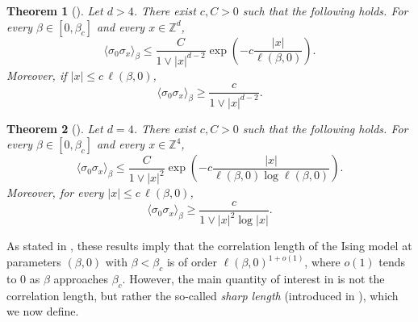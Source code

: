 \documentclass[10pt,a4paper]{amsart}
\numberwithin{equation}{section}
\newtheorem{Thm}{Theorem}[section]
\begin{document}
\begin{Thm}[]\label{thm:bounds 2pt d>4} Let $d>4$. There exist $c,C>0$ such that the following holds. For every $\beta\in [0,\beta_c]$ and every $x\in \mathbb Z^d$,
\begin{equation}
	\langle \sigma_0\sigma_x\rangle_{\beta}\leq \frac{C}{1\vee |x|^{d-2}}\exp\left(-c\frac{|x|}{\ell(\beta,0)}\right).
\end{equation}
Moreover, if $|x|\leq c\,\ell(\beta,0)$,
\begin{equation}
	\langle \sigma_0\sigma_x\rangle_{\beta}\geq \frac{c}{1\vee |x|^{d-2}}.
\end{equation}
\end{Thm}

\begin{Thm}[]\label{thm:bounds 2pt d=4} Let $d=4$. There exist $c,C>0$ such that the following holds. For every $\beta\in [0,\beta_c]$ and every $x\in \mathbb Z^4$,
\begin{equation}\label{eq:nc upper bound d=4 h=0}
	\langle \sigma_0\sigma_x\rangle_{\beta}\leq \frac{C}{1\vee |x|^{2}}\exp\left(-c\frac{|x|}{\ell(\beta,0)\log \ell(\beta,0)}\right).
\end{equation}
Moreover, for every $|x|\leq c\,\ell(\beta,0)$,
\begin{equation}
	\langle \sigma_0\sigma_x\rangle_{\beta}\geq \frac{c}{1\vee |x|^2\log |x|}.
\end{equation}
\end{Thm}

As stated in \cite[Theorem~1.6]{DuminilPanis2024newLB}, these results imply that the correlation length of the Ising model at parameters $(\beta,0)$ with $\beta<\beta_c$ is of order $\ell(\beta,0)^{1+o(1)}$, where $o(1)$ tends to $0$ as $\beta$ approaches $\beta_c$. However, the main quantity of interest in \cite{DuminilPanis2024newLB} is not the correlation length, but rather the so-called \emph{sharp length} (introduced in \cite{hutchcroft2022derivation,PanisTriviality2023}), which we now define.
\end{document}
